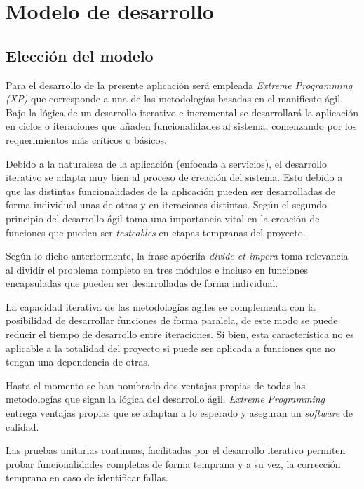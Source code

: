 
\chapter{Modelo de desarrollo}

\section{Elección del modelo}

Para el desarrollo de la presente aplicación será empleada \textit{Extreme Programming (XP)} que corresponde a una de las metodologías basadas en el manifiesto ágil. Bajo la lógica de un desarrollo iterativo e incremental se desarrollará la aplicación en ciclos o iteraciones que añaden funcionalidades al sistema, comenzando por los requerimientos más críticos o básicos.

Debido a la naturaleza de la aplicación (enfocada a servicios), el desarrollo iterativo se adapta muy bien al proceso de creación del sistema. Esto debido a que las distintas funcionalidades de la aplicación pueden ser desarrolladas de forma individual unas de otras y en iteraciones distintas. Según \citet{web02} el segundo principio del desarrollo ágil toma una importancia vital en la creación de funciones que pueden ser \textit{testeables} en etapas tempranas del proyecto. 

Según lo dicho anteriormente, la frase apócrifa \textit{divide et impera} toma relevancia al dividir el problema completo en tres módulos e incluso en funciones encapsuladas que pueden ser desarrolladas de forma individual.

La capacidad iterativa de las metodologías agiles se complementa con la posibilidad de desarrollar funciones de forma paralela, de este modo se puede reducir el tiempo de desarrollo entre iteraciones. Si bien, esta característica no es aplicable a la totalidad del proyecto si puede ser aplicada a funciones que no tengan una dependencia de otras. 

Hasta el momento se han nombrado dos ventajas propias de todas las metodologías que sigan la lógica del desarrollo ágil. \textit{Extreme Programming} entrega ventajas propias que se adaptan a lo esperado y aseguran un \textit{software} de calidad. 

Las pruebas unitarias continuas, facilitadas por el desarrollo iterativo permiten probar funcionalidades completas de forma temprana y a su vez, la corrección temprana en caso de identificar fallas.

